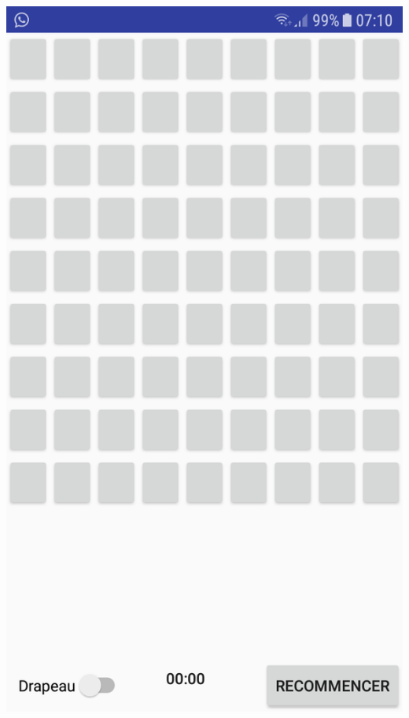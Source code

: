 \documentclass{article}
\begin{document}
\begin{center}
   \includegraphics[scale=0.12]{1.png}

\end{center}
\end{document}
